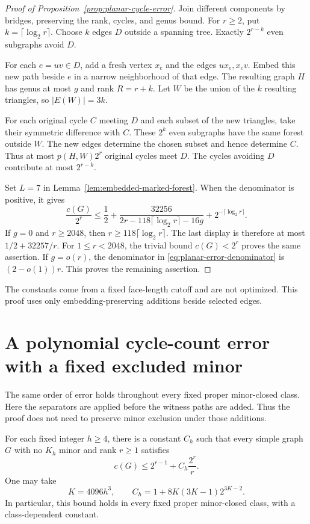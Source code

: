 \begin{proof}[Proof of Proposition~\ref{prop:planar-cycle-error}]
Join different components by bridges, preserving the rank, cycles, and genus bound.
For $r\ge2$, put $k=\lceil\log_2r\rceil$.
Choose $k$ edges $D$ outside a spanning tree.
Exactly $2^{r-k}$ even subgraphs avoid $D$.

For each $e=uv\in D$, add a fresh vertex $x_e$ and the edges $ux_e,x_ev$.
Embed this new path beside $e$ in a narrow neighborhood of that edge.
The resulting graph $H$ has genus at most $g$ and rank $R=r+k$.
Let $W$ be the union of the $k$ resulting triangles, so $|E(W)|=3k$.

For each original cycle $C$ meeting $D$ and each subset of the new triangles, take their symmetric difference with $C$.
These $2^k$ even subgraphs have the same forest outside $W$.
The new edges determine the chosen subset and hence determine $C$.
Thus at most $p(H,W)2^r$ original cycles meet $D$.
The cycles avoiding $D$ contribute at most $2^{r-k}$.

Set $L=7$ in Lemma~\ref{lem:embedded-marked-forest}.
When the denominator is positive, it gives
\begin{equation}\label{eq:planar-error-denominator}
 \frac{c(G)}{2^r}
 \le\frac12+
 \frac{32256}{2r-118\lceil\log_2r\rceil-16g}
 +2^{-\lceil\log_2r\rceil}.
\end{equation}
If $g=0$ and $r\ge2048$, then $r\ge118\lceil\log_2r\rceil$.
The last display is therefore at most $1/2+32257/r$.
For $1\le r<2048$, the trivial bound $c(G)<2^r$ proves the same assertion.
If $g=o(r)$, the denominator in \eqref{eq:planar-error-denominator} is $(2-o(1))r$.
This proves the remaining assertion.
\end{proof}

The constants come from a fixed face-length cutoff and are not optimized.
This proof uses only embedding-preserving additions beside selected edges.

\section{A polynomial cycle-count error with a fixed excluded minor}
\label{sec:minor-cycle-error}

The same order of error holds throughout every fixed proper minor-closed class.
Here the separators are applied before the witness paths are added.
Thus the proof does not need to preserve minor exclusion under those additions.

\begin{theorem}\label{thm:minor-cycle-error}
For each fixed integer $h\ge4$, there is a constant $C_h$ such that every simple graph $G$
with no $K_h$ minor and rank $r\ge1$ satisfies
\[
 c(G)\le2^{r-1}+C_h\frac{2^r}{r}.
\]
One may take
\[
 K=4096h^3,\qquad C_h=1+8K(3K-1)2^{3K-2}.
\]
In particular, this bound holds in every fixed proper minor-closed class, with a class-dependent constant.
\end{theorem}

